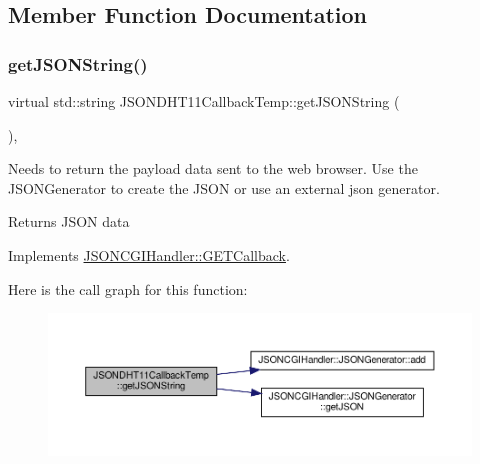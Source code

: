 \subsection{Member Function Documentation}
\mbox{\label{classJSONDHT11CallbackTemp_afe3fed3115bf659bdeb92463c7965dac}} 
\subsubsection{\texorpdfstring{get\+J\+S\+O\+N\+String()}{getJSONString()}}
{\footnotesize\ttfamily virtual std\+::string J\+S\+O\+N\+D\+H\+T11\+Callback\+Temp\+::get\+J\+S\+O\+N\+String (\begin{DoxyParamCaption}{ }\end{DoxyParamCaption})\hspace{0.3cm}{\ttfamily [inline]}, {\ttfamily [virtual]}}

Needs to return the payload data sent to the web browser. Use the J\+S\+O\+N\+Generator to create the J\+S\+ON or use an external json generator. \begin{DoxyReturn}{Returns}
J\+S\+ON data 
\end{DoxyReturn}


Implements \hyperlink{classJSONCGIHandler_1_1GETCallback_a2367bf5a5912e9e5599ee464e0846255}{J\+S\+O\+N\+C\+G\+I\+Handler\+::\+G\+E\+T\+Callback}.

Here is the call graph for this function\+:
\nopagebreak
\begin{figure}[H]
\begin{center}
\leavevmode
\includegraphics[width=350pt]{classJSONDHT11CallbackTemp_afe3fed3115bf659bdeb92463c7965dac_cgraph}
\end{center}
\end{figure}


